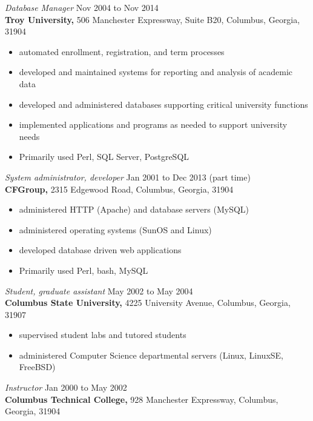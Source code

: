 \documentclass[margin, 10pt]{res} %
\begin{document}
\begin{resume}
{\it Database Manager} \hfill Nov 2004 to Nov 2014 \\
\textbf{Troy University,} 506 Manchester Expressway, Suite B20, Columbus, Georgia, 31904

\begin{itemize} \itemsep -2pt %
\item automated enrollment, registration, and term processes
\item developed and maintained systems for reporting and analysis of academic data
\item developed and administered databases supporting critical university functions 
\item implemented applications and programs as needed to support university needs 
\item Primarily used Perl, SQL Server, PostgreSQL
\end{itemize}
 
{\it System administrator, developer} \hfill Jan 2001 to Dec 2013 (part time) \\
\textbf{CFGroup,} 2315 Edgewood Road, Columbus, Georgia, 31904

\begin{itemize} \itemsep -2pt %
\item administered HTTP (Apache) and database servers (MySQL)
\item administered operating systems (SunOS and Linux)
\item developed database driven web applications
\item Primarily used Perl, bash, MySQL
\end{itemize}
 
{\it Student, graduate assistant} \hfill May 2002 to May 2004 \\
\textbf{Columbus State University,} 4225 University Avenue, Columbus, Georgia, 31907

\begin{itemize} \itemsep -2pt %
\item supervised student labs and tutored students
\item administered Computer Science departmental servers (Linux, LinuxSE, FreeBSD)
\end{itemize}

{\it Instructor} \hfill Jan 2000 to May 2002 \\
\textbf{Columbus Technical College,} 928 Manchester Expressway, Columbus, Georgia, 31904


\end{resume}
\end{document}
